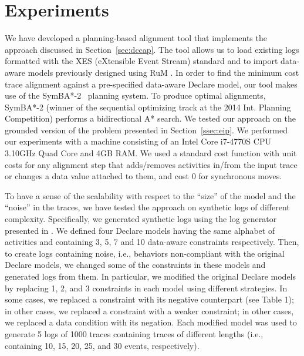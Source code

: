 \section{Experiments}
\label{sec:experiments}



We have developed a planning-based alignment tool that implements the approach discussed in Section~\ref{sec:dccap}.
%
The tool allows us to load existing logs formatted with the XES (eXtensible Event Stream) standard and to import data-aware models previously designed using RuM \cite{AlmanCHMN20}.
%
%
%
In order to find the minimum cost trace alignment against a pre-specified data-aware Declare model, our tool makes use of the SymBA*-2~\cite{torralba2014symba} planning system. To produce optimal alignments, SymBA*-2 (winner of the sequential optimizing track at the 2014 Int. Planning Competition) performs a bidirectional A* search.
%
We tested our approach on the grounded version of the problem presented in Section~\ref{ssec:eip}. We performed our experiments with a machine consisting of an Intel Core i7-4770S CPU 3.10GHz Quad Core and 4GB RAM. We used a standard cost function with unit costs for any alignment step that adds/removes activities in/from the input trace or changes a data value attached to them, and cost 0 for synchronous moves.

%
To have a sense of the scalability with respect to the ``size'' of the model and the ``noise'' in the traces, we have tested the approach on synthetic logs of different complexity.
%
Specifically, we generated synthetic logs using the log generator presented in \cite{SkydanienkoFGM18}. We defined four Declare models having the same alphabet of activities and containing 3, 5, 7 and 10 data-aware constraints respectively.
%
Then, to create logs containing noise, i.e., behaviors non-compliant with the original Declare models, we changed some of the constraints in these models and generated logs from them. In particular, we modified the original Declare models by replacing 1, 2, and 3 constraints in each model using different strategies. In some cases, we replaced a constraint with its negative counterpart (see Table 1); in other cases, we replaced a constraint with a weaker constraint; in other cases, we replaced a data condition with its negation. Each modified model was used to generate 5 logs of 1000 traces containing traces of different lengths (i.e., containing 10, 15, 20, 25, and 30 events, respectively).


